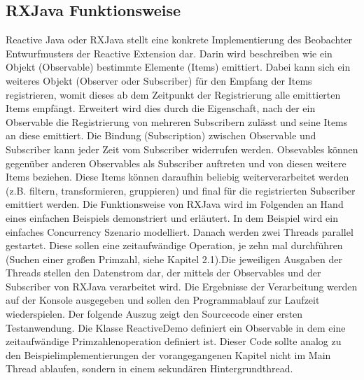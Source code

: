 \documentclass[12pt,oneside,a4paper,bibtotoc,liststotoc]{scrreprt}
\begin{document}
\subsection{RXJava Funktionsweise}
Reactive Java oder RXJava stellt eine konkrete Implementierung des Beobachter Entwurfmusters der Reactive Extension dar. Darin wird beschreiben wie ein Objekt (Observable) bestimmte Elemente (Items) emittiert. Dabei kann sich ein weiteres Objekt (Observer oder Subscriber) für den Empfang der Items registrieren, womit dieses ab dem Zeitpunkt der Registrierung alle emittierten Items empfängt. Erweitert wird dies durch die Eigenschaft, nach der ein Observable die Registrierung von mehreren Subscribern zulässt und seine Items an diese emittiert. Die Bindung (Subscription) zwischen Observable und Subscriber kann jeder Zeit vom Subscriber widerrufen werden. Obsevables können gegenüber anderen Observables als Subscriber auftreten und von diesen weitere Items beziehen. Diese Items können daraufhin beliebig weiterverarbeitet werden (z.B. filtern, transformieren, gruppieren) und final für die registrierten Subscriber emittiert werden.\newline
Die Funktionsweise von RXJava wird im Folgenden an Hand eines einfachen Beispiels demonstriert und erläutert. In dem Beispiel wird ein einfaches Concurrency Szenario modelliert. Danach werden zwei Threads parallel gestartet. Diese sollen eine zeitaufwändige Operation, je zehn mal durchführen (Suchen einer großen Primzahl, siehe Kapitel 2.1).Die jeweiligen Ausgaben der Threads stellen den Datenstrom dar, der mittels der Observables und der Subscriber von RXJava verarbeitet wird. Die Ergebnisse der Verarbeitung werden auf der Konsole ausgegeben und sollen den Programmablauf zur Laufzeit wiederspielen. Der folgende Auszug zeigt den Sourcecode einer ersten Testanwendung. Die Klasse ReactiveDemo definiert ein Observable in dem eine zeitaufwändige Primzahlenoperation definiert ist. Dieser Code sollte analog zu den Beispielimplementierungen der vorangegangenen Kapitel nicht im Main Thread ablaufen, sondern in einem sekundären Hintergrundthread.\newline
\end{document}
